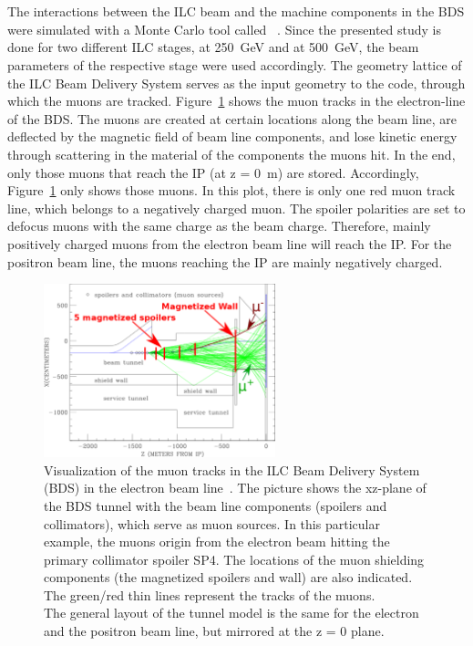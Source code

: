 \section{\mucarlo}
\label{BDS_Muons:MUCARLO}
The interactions between the ILC beam and the machine components in the BDS were simulated with a Monte Carlo tool called \mucarlo~\cite{MuonBkg_1TeV,Mucarlo,MuonBkg_05TeV}.
Since the presented study is done for two different ILC stages, at \SI{250}{\GeV} and at \SI{500}{\GeV}, the beam parameters of the respective stage were used accordingly.
The geometry lattice of the ILC Beam Delivery System serves as the input geometry to the \mucarlo code, through which the muons are tracked.
Figure~\ref{fig:BDS_Muons:tracks} shows the muon tracks in the electron-line of the BDS.
The muons are created at certain locations along the beam line, are deflected by the magnetic field of beam line components, and lose kinetic energy through scattering in the material of the components the muons hit.
In the end, only those muons that reach the IP (at z = \SI{0}{\meter}) are stored.
Accordingly, Figure~\ref{fig:BDS_Muons:tracks} only shows those muons.
In this plot, there is only one red muon track line, which belongs to a negatively charged muon.
The spoiler polarities are set to defocus muons with the same charge as the beam charge.
Therefore, mainly positively charged muons from the electron beam line will reach the IP.
For the positron beam line, the muons reaching the IP are mainly negatively charged.
\begin{figure}[h]
\centering
\includegraphics[width=0.6\textwidth]{Figures/BDS_muons/BDS_Tunnel_Spoilers+Wall_edited.png}
\caption[Muon tracks in the Beam Delivery Systems]{Visualization of the muon tracks in the ILC Beam Delivery System (BDS) in the electron beam line~\cite{Lewis}.
The picture shows the xz-plane of the BDS tunnel with the beam line components (spoilers and collimators), which serve as muon sources.
In this particular example, the muons origin from the electron beam hitting the primary collimator spoiler SP4.
The locations of the muon shielding components (the magnetized spoilers and wall) are also indicated.
The green/red thin lines represent the tracks of the muons.
\\The general layout of the tunnel model is the same for the electron and the positron beam line, but mirrored at the z = 0 plane.}
\label{fig:BDS_Muons:tracks}
\end{figure}

